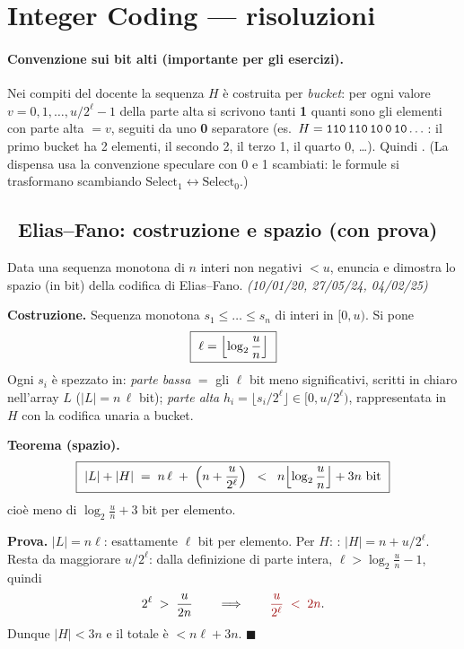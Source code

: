 \section{Integer Coding --- risoluzioni}

\paragraph{Convenzione sui bit alti (importante per gli esercizi).} Nei compiti del docente la
sequenza $H$ \`e costruita per \emph{bucket}: per ogni valore $v=0,1,\dots,u/2^{\ell}-1$ della
parte alta si scrivono tanti \textbf{1} quanti sono gli elementi con parte alta $=v$, seguiti da
uno \textbf{0} separatore (es.\ $H=\texttt{110\,110\,10\,0\,10}\dots$: il primo bucket ha 2
elementi, il secondo 2, il terzo 1, il quarto 0, \dots). Quindi . (La dispensa usa la convenzione speculare con 0 e 1 scambiati: le
formule si trasformano scambiando $\mathrm{Select}_1\leftrightarrow\mathrm{Select}_0$.)

\subsection*{\hot\ Elias--Fano: costruzione e spazio (con prova)}

\begin{domanda}
Data una sequenza monotona di $n$ interi non negativi $<u$, enuncia e dimostra lo spazio (in bit)
della codifica di Elias--Fano. \emph{(10/01/20, 27/05/24, 04/02/25)}
\end{domanda}

\textbf{Costruzione.} Sequenza monotona $s_1\le\dots\le s_n$ di interi in $[0,u)$. Si pone
\[
\boxed{\ \ell=\Bigl\lfloor\log_2\frac{u}{n}\Bigr\rfloor\ }
\]
Ogni $s_i$ \`e spezzato in: \emph{parte bassa} $=$ gli $\ell$ bit meno significativi, scritti in
chiaro nell'array $L$ ($|L|=n\,\ell$ bit); \emph{parte alta} $h_i=\lfloor s_i/2^{\ell}\rfloor\in
[0,u/2^{\ell})$, rappresentata in $H$ con la codifica unaria a bucket.

\textbf{Teorema (spazio).}
\[
\boxed{\ |L|+|H| \;=\; n\,\ell \;+\; \Bigl(n+\frac{u}{2^{\ell}}\Bigr)
\;\;<\;\; n\Bigl\lfloor\log_2\frac{u}{n}\Bigr\rfloor+3n\ \text{bit}\ }
\]
cio\`e meno di $\log_2\frac{u}{n}+3$ bit per elemento.

\textbf{Prova.} $|L|=n\ell$: esattamente $\ell$ bit per elemento. Per $H$: : $|H|=n+u/2^{\ell}$. Resta da
maggiorare $u/2^{\ell}$: dalla definizione di parte intera, $\ell>\log_2\frac{u}{n}-1$, quindi
\[
2^{\ell} \;>\; \frac{u}{2n}
\qquad\Longrightarrow\qquad
\kw{\frac{u}{2^{\ell}}\;<\;2n} .
\]
Dunque $|H|<3n$ e il totale \`e $<n\ell+3n$. $\blacksquare$

